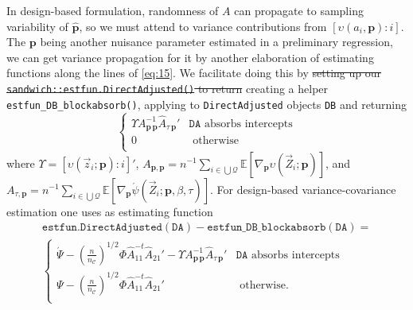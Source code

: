 \documentclass{article}
\newcommand{\absorbInterceptsEF}{\upsilon}
\newcommand{\AbsorbInterceptsEF}{\Upsilon}
\begin{document}
In design-based formulation, randomness of $A$ can propagate to
sampling variability of $\hat{\mathbf{p}}$,  so we must attend to
variance contributions from $[\absorbInterceptsEF(a_{i}, \mathbf{p}): i]$. 
The $\mathbf{p}$ being another nuisance parameter estimated in a
preliminary regression, we can get variance propagation for it by
another elaboration of estimating functions along the lines of
\eqref{eq:15}. We facilitate doing
this by \st{setting up our
\texttt{sandwich::estfun.DirectAdjusted()} to return} creating a
helper \texttt{estfun\_DB\_blockabsorb()}, applying to
\texttt{DirectAdjusted} objects \texttt{DB} and returning
\begin{equation*}
\begin{cases}
  \AbsorbInterceptsEF{}
  A_{\mathbf{p}\,\mathbf{p}}^{-1}\hat{A}_{\tau\,\mathbf{p}}' &
  \mathtt{DA} \text{ absorbs intercepts}\\
0 & \text{ otherwise}\\
\end{cases}
\end{equation*}
where 
$\AbsorbInterceptsEF= [\absorbInterceptsEF(\vec{z}_{i}; \mathbf{p}): i]'$, 
$A_{\mathbf{p}, \mathbf{p}} = n^{-1}\sum_{i\in \bigcup
  \mathcal{Q}}\mathbb{E} [\nabla_{\mathbf{p}}\absorbInterceptsEF(\vec{Z}_{i};
\mathbf{p})]$, and $A_{\tau, \mathbf{p}} = n^{-1} \sum_{i\in \bigcup
  \mathcal{Q}}\mathbb{E}[\nabla_{\mathbf{p}}\acute{\psi}(\vec{Z}_{i};
\mathbf{p}, \beta, \tau)]$.  For design-based variance-covariance
estimation one uses as estimating function
\begin{multline*}
  \mathtt{estfun.DirectAdjusted(DA)} -
  \mathtt{estfun\_DB\_blockabsorb(DA)} =\\
\begin{cases}
\acute{\Psi} -
  \left(\frac{n}{n_{\mathcal{C}}}\right)^{1/2}\Phi
  \hat{A}_{11}^{-t}\hat{A}_{21}'  - \AbsorbInterceptsEF{}
  A_{\mathbf{p}\,\mathbf{p}}^{-1}\hat{A}_{\tau\,\mathbf{p}}' & \mathtt{DA} \text{ absorbs intercepts}\\
 \Psi -
  \left(\frac{n}{n_{\mathcal{C}}}\right)^{1/2}\Phi
  \hat{A}_{11}^{-t}\hat{A}_{21}' 
 & \text{ otherwise}.\\
\end{cases}
\end{multline*}
\end{document}
